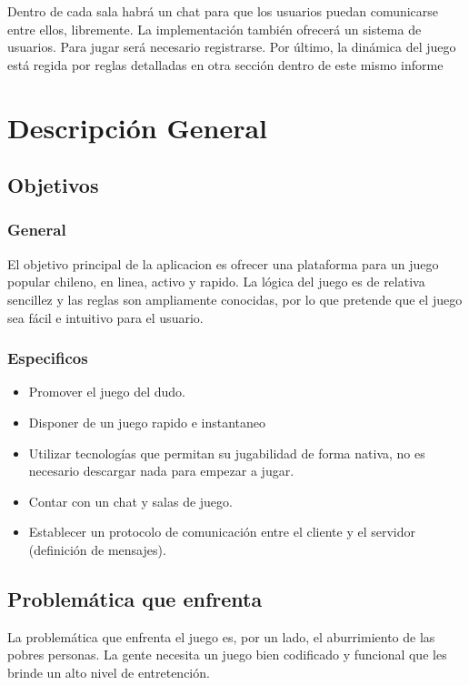 \documentclass[a4paper,11pt]{article}
\begin{document}
	Dentro de cada sala habrá un chat para que los usuarios puedan 
comunicarse entre ellos, libremente.
	La implementación también ofrecerá un sistema de usuarios. Para jugar
será necesario registrarse. Por último, la dinámica del juego está regida por 
reglas detalladas en otra sección dentro de este mismo informe 

\newpage
\section{Descripción General}
\subsection{Objetivos}
\subsubsection{General}

	El objetivo principal de la aplicacion es ofrecer una plataforma para
un juego popular chileno, en linea, activo y rapido. La lógica del juego
es de relativa sencillez y las reglas son ampliamente conocidas, por lo que
pretende que el juego sea fácil e intuitivo para el usuario.

 
\subsubsection{Especificos}
\begin{itemize}
	\item Promover el juego del dudo.
	\item Disponer de un juego rapido e instantaneo
	\item Utilizar tecnologías que permitan su jugabilidad de forma nativa,
	no es necesario descargar nada para empezar a jugar.
	\item Contar con un chat y salas de juego.
	\item Establecer un protocolo de comunicación entre el cliente y el servidor (definición de mensajes).
\end{itemize}

\subsection{Problemática que enfrenta}

	La problemática que enfrenta el juego es, por un lado, el aburrimiento de las pobres personas. La gente necesita un juego bien codificado y funcional
que les brinde un alto nivel de entretención.\\
\end{document}
